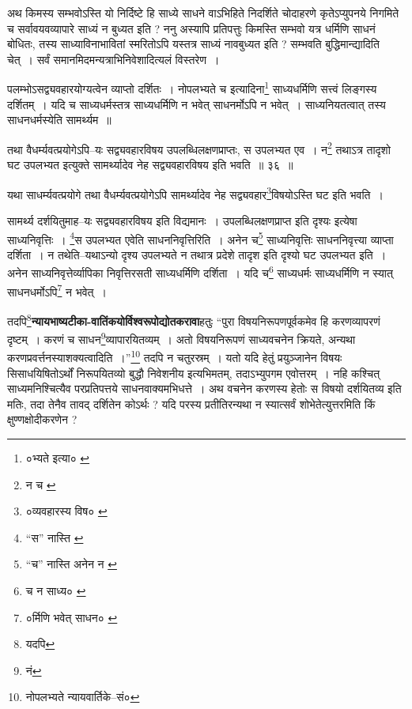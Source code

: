 \documentclass[article,12pt,a4paper]{memoir}
\begin{document}
	  \pstart अथ किमस्य सम्भवोऽस्ति यो निर्दिष्टे हि साध्ये साधने वाऽभिहिते निदर्शिते चोदाहरणे कृतेऽप्युपनये निगमिते च सर्वावयवव्यापारे साध्यं न बुध्यत इति ? ननु अस्यापि प्रतिपत्तुः किमस्ति सम्भवो यत्र धर्मिणि साधनं बोधितः, तस्य साध्याविनाभावितां स्मरितोऽपि यस्तत्र साध्यं नावबुध्यत इति ? सम्भवति बुद्धिमान्द्यादिति चेत् । सर्वं समानमिदमन्यत्राभिनिवेशादित्यलं विस्तरेण ।
	\pend
      \leavevmode{}
	  \bigskip
	  \begingroup
	

	  \pstart पलम्भोऽसद्व्यवहारयोग्यत्वेन व्याप्तो दर्शितः । नोपलभ्यते च इत्यादिना\footnote{०भ्यते इत्या० \cite{dp-msA} \cite{dp-msB} \cite{dp-edP} \cite{dp-edH} \cite{dp-edN}} साध्यधर्मिणि सत्त्वं लिङ्गस्य दर्शितम् । यदि च साध्यधर्मस्तत्र साध्यधर्मिणि न भवेत् साधनर्मोऽपि न भवेत् । साध्यनियतत्वात् तस्य साधनधर्मस्येति सामर्थ्यम ॥
	\pend
       
	  \bigskip
	  \begingroup
	

	  \pstart तथा वैधर्म्यवत्प्रयोगेऽपि--यः सद्व्यवहारविषय उपलब्धिलक्षणप्राप्तः, स उपलभ्यत एव । न\footnote{न च \cite{dp-msC}} तथाऽत्र तादृशो घट उपलभ्यत इत्युक्ते सामर्थ्यादेव नेह सद्व्यवहारविषय इति भवति ॥ ३६ ॥
	\pend
      
	  \endgroup
	 

	  \pstart यथा साधर्म्यवत्प्रयोगे तथा वैधर्म्यवत्प्रयोगेऽपि सामर्थ्यादेव नेह सद्व्यवहार\footnote{०व्यवहारस्य विष० \cite{dp-msC} \cite{dp-msD}}विषयोऽस्ति घट इति भवति ।
	\pend
       

	  \pstart सामर्थ्य दर्शयितुमाह--यः सद्व्यवहारविषय इति विद्यमानः । उपलब्धिलक्षणप्राप्त इति दृश्यः इत्येषा साध्यनिवृत्तिः । \footnote{“स” नास्ति \cite{dp-msA} \cite{dp-msB} \cite{dp-msC} \cite{dp-msD} \cite{dp-edP} \cite{dp-edH}}स उपलभ्यत एवेति साधननिवृत्तिरिति । अनेन च\footnote{“च” नास्ति \cite{dp-msC} \cite{dp-edE} अनेन न \cite{dp-edH}} साध्यनिवृत्तिः साधननिवृत्त्या व्याप्ता दर्शिता । न तथेति--यथाऽन्यो दृश्य उपलभ्यते न तथात्र प्रदेशे तादृश इति दृश्यो घट उपलभ्यत इति । अनेन साध्यनिवृत्तेर्व्यापिका निवृत्तिरसती साध्यधर्मिणि दर्शिता । यदि च\footnote{च न साध्य० \cite{dp-msA} \cite{dp-msB} \cite{dp-edP} \cite{dp-edH} \cite{dp-edN}} साध्यधर्मः साध्यधर्मिणि न स्यात् साधनधर्मोऽपि\footnote{०र्मिणि भवेत् साधन० \cite{dp-msA} \cite{dp-msB} \cite{dp-edP} \cite{dp-edH} \cite{dp-edE} \cite{dp-edN}} न भवेत् ।
	\pend
      
	  \endgroup
	

	  \pstart तदपि\footnote{यदपि}\textbf{न्यायभाष्यटीका-वातिंकयोर्विश्वरूपोद्योतकरावा}हतुः “पुरा विषयनिरूपणपूर्वकमेव हि करणव्यापरणं दृष्टम् । करणं च साधन\footnote{नं}व्यापारयितव्यम् । अतो विषयनिरूपणं साध्यवचनेन क्रियते, अन्यथा करणप्रवर्त्तनस्याशक्यत्वादिति ।”\footnote{नोपलभ्यते न्यायवार्तिके--सं०} तदपि न चतुरस्रम् । यतो यदि हेतुं प्रयुञ्जानेन विषयः सिसाधयिषितोऽर्थों निरूपयितव्यो बुद्धौ निवेशनीय इत्यभिमतम्, तदाऽभ्युपगम एवोत्तरम् । नहि कश्चित् साध्यमनिश्चित्यैव परप्रतिपत्तये साधनवाक्यमभिधत्ते । अथ वचनेन करणस्य हेतोः स विषयो दर्शयितव्य इति मतिः, तदा तेनैव तावद् दर्शितेन कोऽर्थः ? यदि परस्य प्रतीतिरन्यथा न स्यात्सर्वं शोभेतेत्युत्तरमिति किं क्षुण्णक्षोदीकरणेन ?
	\pend
      
\end{document}
